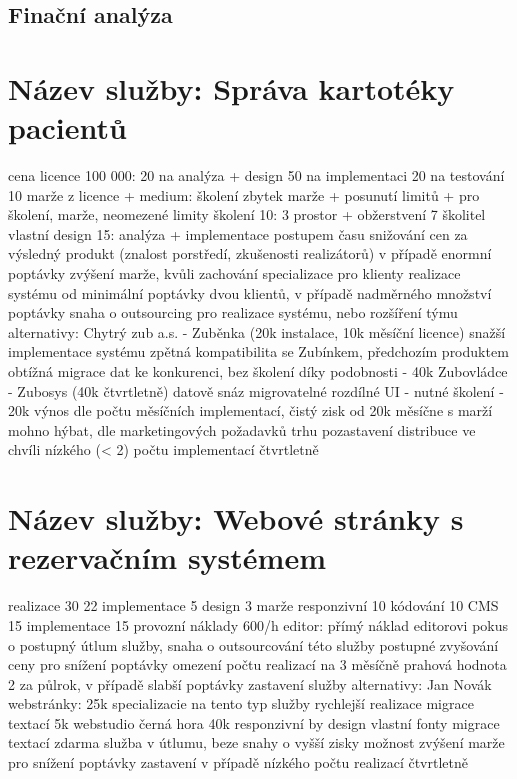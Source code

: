 \documentclass[11pt, a4paper, titlepage]{article}
\begin{document}
	
	\pagestyle{fancy}

	\begin{center}
		\section*{Finační analýza}
	\end{center}
	\section*{Název služby: Správa kartotéky pacientů}
		cena licence 100 000:
			20 na analýza + design
			50 na implementaci
			20 na testování
			10 marže z licence
		+ medium:
			školení
			zbytek marže + posunutí limitů
		+ pro
			školení, marže, neomezené limity
		školení 10:
			3 prostor + obžerstvení
			7 školitel
		vlastní design 15:
			analýza + implementace
		postupem času snižování cen za výsledný produkt (znalost porstředí, zkušenosti realizátorů)
		v případě enormní poptávky zvýšení marže, kvůli zachování specializace pro klienty
		realizace systému od minimální poptávky dvou klientů, v případě nadměrného množství poptávky snaha o outsourcing pro realizace systému, nebo rozšíření týmu
		alternativy:
			Chytrý zub a.s. - Zuběnka (20k instalace, 10k měsíční licence)
				snažší implementace systému
				zpětná kompatibilita se Zubínkem, předchozím produktem
				obtížná migrace dat ke konkurenci, bez školení díky podobnosti - 40k
			Zubovládce - Zubosys (40k čtvrtletně)
				datově snáz migrovatelné
				rozdílné UI - nutné školení - 20k
		výnos dle počtu měsíčních implementací, čistý zisk od 20k měsíčne
		s marží mohno hýbat, dle marketingových požadavků trhu
		pozastavení distribuce ve chvíli nízkého (< 2) počtu implementací čtvrtletně
	\section*{Název služby: Webové stránky s rezervačním systémem}
		realizace 30
			22 implementace
			5 design
			3 marže
		responzivní 10
			kódování 10
		CMS 15
			implementace 15
		provozní náklady
			600/h editor:
				přímý náklad editorovi
		pokus o postupný útlum služby, snaha o outsourcování této služby
		postupné zvyšování ceny pro snížení poptávky
		omezení počtu realizací na 3 měsíčně
		prahová hodnota 2 za půlrok, v případě slabší poptávky zastavení služby
		alternativy:
			Jan Novák webstránky:
				25k
				specializacie na tento typ služby
				rychlejší realizace
				migrace textací 5k
			webstudio černá hora
				40k
				responzivní by design
				vlastní fonty
				migrace textací zdarma
		služba v útlumu, beze snahy o vyšší zisky
		možnost zvýšení marže pro snížení poptávky
		zastavení v případě nízkého počtu realizací čtvrtletně
\end{document}
